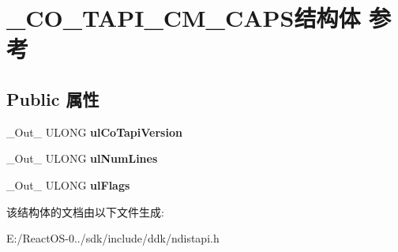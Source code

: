 \hypertarget{struct___c_o___t_a_p_i___c_m___c_a_p_s}{}\section{\+\_\+\+C\+O\+\_\+\+T\+A\+P\+I\+\_\+\+C\+M\+\_\+\+C\+A\+P\+S结构体 参考}
\label{struct___c_o___t_a_p_i___c_m___c_a_p_s}
\subsection*{Public 属性}
\begin{DoxyCompactItemize}
\item 
\mbox{\label{struct___c_o___t_a_p_i___c_m___c_a_p_s_ae493fc7a1cba9dbca23b17e1afd1b9d4}} 
\+\_\+\+Out\+\_\+ U\+L\+O\+NG {\bfseries ul\+Co\+Tapi\+Version}
\item 
\mbox{\label{struct___c_o___t_a_p_i___c_m___c_a_p_s_a8d18664f59314be8ed504180fde1f469}} 
\+\_\+\+Out\+\_\+ U\+L\+O\+NG {\bfseries ul\+Num\+Lines}
\item 
\mbox{\label{struct___c_o___t_a_p_i___c_m___c_a_p_s_aa349588a7145a3c914299156da79f90e}} 
\+\_\+\+Out\+\_\+ U\+L\+O\+NG {\bfseries ul\+Flags}
\end{DoxyCompactItemize}


该结构体的文档由以下文件生成\+:\begin{DoxyCompactItemize}
\item 
E\+:/\+React\+O\+S-\/0../sdk/include/ddk/ndistapi.\+h\end{DoxyCompactItemize}
